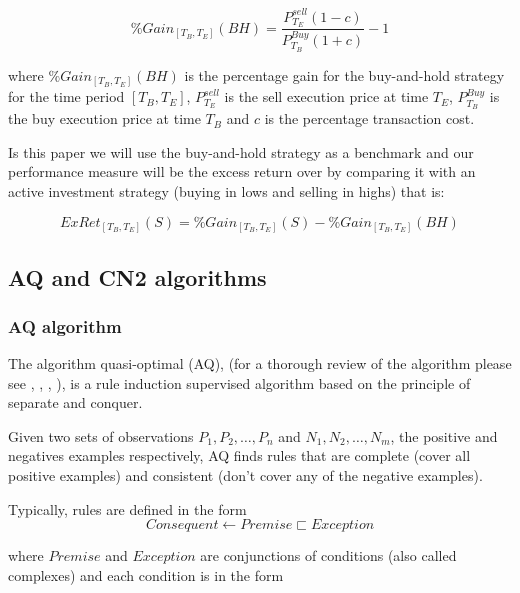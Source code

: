 \documentclass[preprint,3p,twocolumn]{elsarticle}
\begin{document}
\begin{equation} \label{eqn:buy-and-hold gain}
\%Gain_{ \left[T_{B}, T_{E} \right]} (BH) = \dfrac{P_{T_{E}}^{sell}  (1 - c)}{P_{T_{B}}^{Buy}  (1 + c)} - 1
\end{equation}

where $\%Gain_{ \left[T_{B}, T_{E} \right]} (BH)$ is the percentage gain for the buy-and-hold strategy for the time period $\left[T_{B}, T_{E} \right]$, $P_{T_{E}}^{sell}$ is the sell execution price at time $T_{E}$, $P_{T_{B}}^{Buy}$ is the buy execution price at time $T_{B}$ and $c$ is the percentage transaction cost.

Is this paper we will use the buy-and-hold strategy as a benchmark and our performance measure will be the excess return over by comparing it with an active investment strategy (buying in lows and selling in highs) that is:

\begin{equation} \label{eqn:excess return}
ExRet_{ \left[T_{B}, T_{E} \right]} (S) = \%Gain_{ \left[T_{B}, T_{E} \right]}(S)  - \%Gain_{ \left[T_{B}, T_{E} \right]}(BH)
\end{equation}

\subsection{AQ and CN2 algorithms}
\label{subsec:algorithms}

\subsubsection{AQ algorithm}
\label{subsubsec: aq algorithm}
The algorithm quasi-optimal (AQ), (for a thorough review of the algorithm please see \cite{michalski1969quasi}, \cite{AQMichalski1991}, \cite{AQCervone2010}, \cite{AQWojtusiak2012}), is a rule induction supervised algorithm based on the principle of separate and conquer.

Given two sets of observations $P_1, P_2, \ldots, P_n$ and $N_1, N_2, \ldots, N_m$, the positive and negatives examples respectively, AQ finds rules that are complete (cover all positive examples) and consistent (don't cover any of the negative examples).

Typically, rules are defined in the form 
$$ Consequent \leftarrow Premise \sqsubset Exception $$ 

where $Premise$ and $Exception$ are conjunctions of conditions (also called complexes) and each condition is in the form
\end{document}
